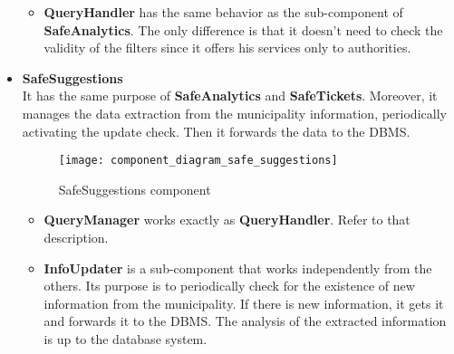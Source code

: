 \documentclass[./main.tex]{subfiles}
\begin{document}
\begin{itemize}
  \begin{itemize}
  \item
    \textbf{QueryHandler} has the same behavior as the sub-component of
    \textbf{SafeAnalytics}. The only difference is that it doesn't need to
    check the validity of the filters since it offers his services only to
    authorities.
  \end{itemize}
\item
  \textbf{SafeSuggestions}\\
  It has the same purpose of \textbf{SafeAnalytics} and \textbf{SafeTickets}.
  Moreover, it manages the data extraction from the municipality information,
  periodically activating the update check. Then it forwards the data to the
  DBMS.
  \begin{figure}[H]
  \centering
  \texttt{[image: component\_diagram\_safe\_suggestions]}
  \caption{SafeSuggestions component}
  \end{figure}
  \begin{itemize}
  \item
    \textbf{QueryManager} works exactly as \textbf{QueryHandler}. Refer to that
    description.
  \item
    \textbf{InfoUpdater} is a sub-component that works independently from the
    others. Its purpose is to periodically check for the existence of new
    information from the municipality. If there is new information, it gets it
    and forwards it to the DBMS. The analysis of the extracted information is
    up to the database system.
  \end{itemize}
\end{itemize}
\end{document}
